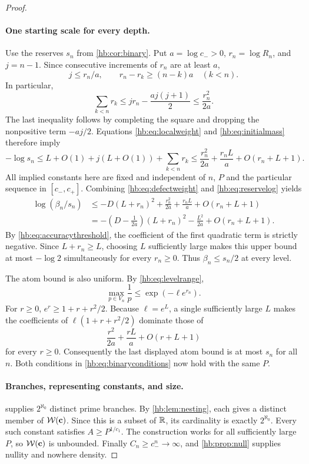 \begin{proof}
\paragraph{One starting scale for every depth.}
Use the reserves $s_n$ from \cref{hb:cor:binary}.
Put $a=\log c_->0$, $r_n=\log R_n$, and $j=n-1$.
Since consecutive increments of $r_n$ are at least $a$,
\[
 j\le r_n/a,\qquad
 r_n-r_k\ge(n-k)a\quad(k<n).
\]
In particular,
\[
 \sum_{k<n}r_k
 \le j r_n-\frac{a j(j+1)}2
 \le\frac{r_n^2}{2a}.
 \tag{Q}\label{hb:eq:sumlogs}
\]
The last inequality follows by completing the square and dropping
the nonpositive term $-aj/2$.
Equations \eqref{hb:eq:localweight} and
\eqref{hb:eq:initialmass} therefore imply
\[
 -\log s_n
 \le L+O(1)+j(L+O(1))+\sum_{k<n}r_k
 \le\frac{r_n^2}{2a}+\frac{r_n L}{a}
             +O(r_n+L+1).
 \tag{M}\label{hb:eq:reservelog}
\]
All implied constants here are fixed and independent of $n$, $P$
and the particular sequence in $[c_-,c_+]$.
Combining \eqref{hb:eq:defectweight} and
\eqref{hb:eq:reservelog} yields
\[
 \begin{split}
 \log(\beta_n/s_n)
 &\le
 -D(L+r_n)^2+\frac{r_n^2}{2a}
           +\frac{r_n L}{a}+O(r_n+L+1)\\
 &=
 -\left(D-\frac1{2a}\right)(L+r_n)^2
 -\frac{L^2}{2a}+O(r_n+L+1).
 \end{split}
 \tag{U}\label{hb:eq:uniformcomparison}
\]
By \eqref{hb:eq:accuracythreshold}, the coefficient of the first
quadratic term is strictly negative.  Since $L+r_n\ge L$, choosing
$L$ sufficiently large makes this upper bound at most $-\log2$
simultaneously for every $r_n\ge0$.
Thus $\beta_n\le s_n/2$ at every level.

The atom bound is also uniform.  By \eqref{hb:eq:levelrange},
\[
 \max_{p\in V_n}\frac1p\le
          \exp(-\ell e^{r_n}).
\]
For $r\ge0$, $e^r\ge1+r+r^2/2$.  Because $\ell=e^L$,
a single sufficiently large $L$ makes the coefficients of
$\ell(1+r+r^2/2)$ dominate those of
\[
 \frac{r^2}{2a}+\frac{rL}{a}+O(r+L+1)
\]
for every $r\ge0$.  Consequently the last displayed atom bound
is at most $s_n$ for all $n$.
Both conditions in \eqref{hb:eq:binaryconditions} now hold
with the same $P$.

\paragraph{Branches, representing constants, and size.}
 supplies $2^{\aleph_0}$ distinct prime
branches.  By \cref{hb:lem:nesting}, each gives a distinct member
of $\mathcal W(\mathbf c)$.  Since this is a subset of $\mathbb R$, its
cardinality is exactly $2^{\aleph_0}$.
Every such constant satisfies $A\ge P^{1/c_1}$.
The construction works for all sufficiently large $P$, so
$\mathcal W(\mathbf c)$ is unbounded.
Finally $C_n\ge c_-^n\to\infty$, and
\cref{hb:prop:null} supplies nullity and nowhere density.
\end{proof}

